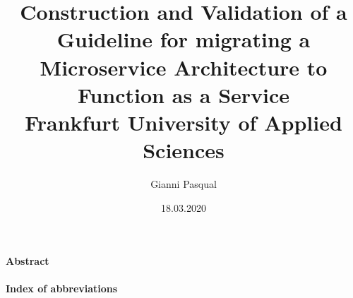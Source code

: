 \documentclass[11pt]{article}
\title{
{Construction and Validation of a Guideline for migrating a Microservice Architecture to Function as a Service}\\
{\large Frankfurt University of Applied Sciences}\\}
\author{Gianni Pasqual}
\date{18.03.2020}
\begin{document}
\maketitle
\newpage
{\Large \textbf {Abstract}}
\\\\ %
\newpage
{\Large \textbf {Index of abbreviations}}
\\\\ \\
\end{document}
